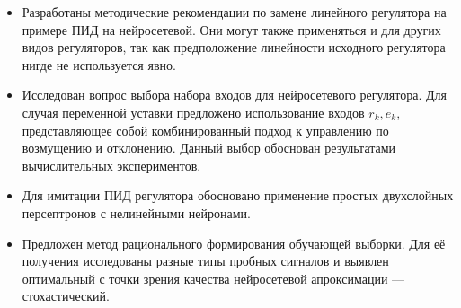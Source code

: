 \begin{itemize}

\item Разработаны методические рекомендации по замене линейного
  регулятора на примере ПИД на нейросетевой.  Они могут также
  применяться и для других видов регуляторов, так как предположение
  линейности исходного регулятора нигде не используется явно.

\item Исследован вопрос выбора набора входов для нейросетевого
  регулятора.  Для случая переменной уставки предложено использование
  входов $r_k,e_k$, представляющее собой комбинированный подход к
  управлению по возмущению и отклонению.  Данный выбор обоснован
  результатами вычислительных экспериментов.

\item Для имитации ПИД регулятора обосновано применение простых
  двухслойных персептронов с нелинейными нейронами.

\item Предложен метод рационального формирования обучающей выборки.
  Для её получения исследованы разные типы пробных сигналов и выявлен
  оптимальный с точки зрения качества нейросетевой апроксимации ---
  стохастический.



\end{itemize}
